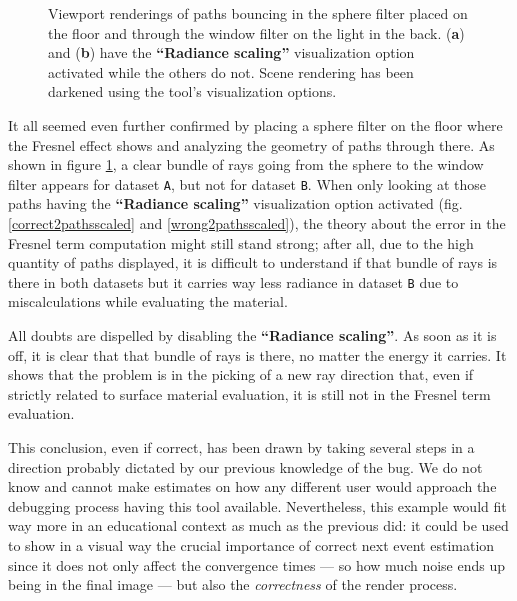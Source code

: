 \begin{figure}
	\caption{Viewport renderings of paths bouncing in the sphere filter placed on the floor and through the window filter on the light in the back. (\textbf{a}) and (\textbf{b}) have the \textbf{“Radiance scaling”} visualization option activated while the others do not. Scene rendering has been darkened using the tool's visualization options.}
	\label{couple2paths}
\end{figure}

It all seemed even further confirmed by placing a sphere filter on the floor where the Fresnel effect shows and analyzing the geometry of paths through there. As shown in figure \ref{couple2paths}, a clear bundle of rays going from the sphere to the window filter appears for dataset \texttt{A}, but not for dataset \texttt{B}. When only looking at those paths having the \textbf{“Radiance scaling”} visualization option activated (fig. \ref{correct2pathsscaled} and \ref{wrong2pathsscaled}), the theory about the error in the Fresnel term computation  might still stand strong; after all, due to the high quantity of paths displayed, it is difficult to understand if that bundle of rays is there in both datasets but it carries way less radiance in dataset \texttt{B} due to miscalculations while evaluating the material.

All doubts are dispelled by disabling the \textbf{“Radiance scaling”}. As soon as it is off, it is clear that that bundle of rays is there, no matter the energy it carries. It shows that the problem is in the picking of a new ray direction that, even if strictly related to surface material evaluation, it is still not in the Fresnel term evaluation.

This conclusion, even if correct, has been drawn by taking several steps in a direction probably dictated by our previous knowledge of the bug. We do not know and cannot make estimates on how any different user would approach the debugging process having this tool available. Nevertheless, this example would fit way more in an educational context as much as the previous did: it could be used to show in a visual way the crucial importance of correct next event estimation since it does not only affect the convergence times --- so how much noise ends up being in the final image --- but also the \textit{correctness} of the render process.